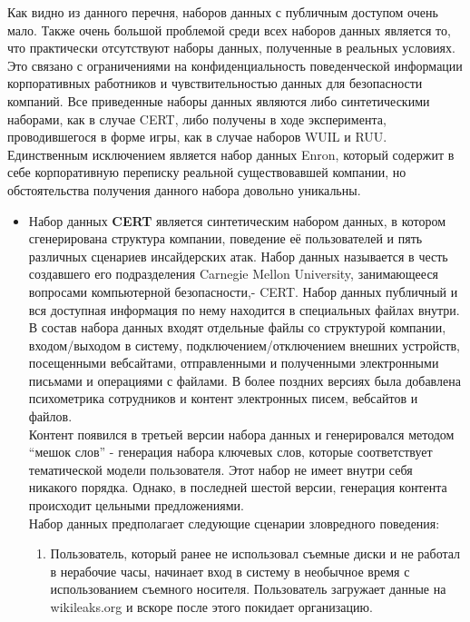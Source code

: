 Как видно из данного перечня, наборов данных с публичным доступом очень мало. Также очень большой проблемой среди всех наборов данных является то, что практически отсутствуют наборы данных, полученные в реальных условиях. Это связано с ограничениями на конфиденциальность поведенческой информации корпоративных работников и чувствительностью данных для безопасности компаний. Все приведенные наборы данных являются либо синтетическими наборами, как в случае CERT, либо получены в ходе эксперимента, проводившегося в форме игры, как в случае наборов WUIL и RUU. Единственным исключением является набор данных Enron, который содержит в себе корпоративную переписку реальной существовавшей компании, но обстоятельства получения данного набора довольно уникальны.

\begin{itemize}
\item Набор данных \textbf{CERT} является синтетическим набором данных, в котором сгенерирована структура компании, поведение её пользователей и пять различных сценариев инсайдерских атак. Набор данных называется в честь создавшего его подразделения Carnegie Mellon University, занимающееся вопросами компьютерной безопасности,- CERT. Набор данных публичный \cite{InsiderThreatTest} и вся доступная информация по нему находится в специальных файлах внутри. В состав набора данных входят отдельные файлы со структурой компании, входом/выходом в систему, подключением/отключением внешних устройств, посещенными вебсайтами, отправленными и полученными электронными письмами и операциями с файлами. В более поздних версиях была добавлена психометрика сотрудников и контент электронных писем, вебсайтов и файлов. \\
Контент появился в третьей версии набора данных и генерировался методом ``мешок слов'' - генерация набора ключевых слов, которые соответствует тематической модели пользователя. Этот набор не имеет внутри себя никакого порядка. Однако, в последней шестой версии, генерация контента происходит цельными предложениями.\\
Набор данных предполагает следующие сценарии зловредного поведения:\\
\begin{enumerate}
	\item Пользователь, который ранее не использовал съемные диски и не работал в нерабочие часы, начинает вход в систему в необычное время с использованием съемного носителя. Пользователь загружает данные на wikileaks.org и вскоре после этого покидает организацию.\\

\end{enumerate}
\end{itemize}
